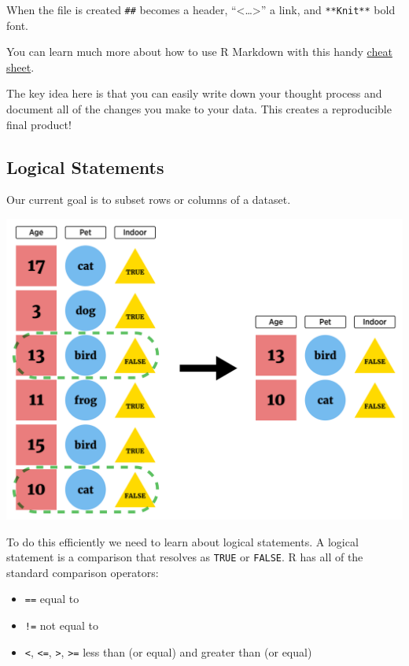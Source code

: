 \documentclass[
]{book}
\providecommand{\tightlist}{%
  \setlength{\itemsep}{0pt}\setlength{\parskip}{0pt}}
\theoremstyle{definition}
\theoremstyle{definition}
\theoremstyle{definition}
\theoremstyle{remark}
\begin{document}
When the file is created \texttt{\#\#} becomes a header, ``\textless{}\ldots{}\textgreater{}'' a link, and \texttt{**Knit**} bold font.

You can learn much more about how to use R Markdown with this handy \href{https://www.rstudio.com/wp-content/uploads/2015/03/rmarkdown-reference.pdf}{cheat sheet}.

The key idea here is that you can easily write down your thought process and document all of the changes you make to your data. This creates a reproducible final product!

\hypertarget{logical-statements-1}{%
\subsection{Logical Statements}\label{logical-statements-1}}

Our current goal is to subset rows or columns of a dataset.

\begin{center}\includegraphics[width=0.8\linewidth]{img/filterVisualF} \end{center}

To do this efficiently we need to learn about logical statements. A logical statement is a comparison that resolves as \texttt{TRUE} or \texttt{FALSE}. R has all of the standard comparison operators:

\begin{itemize}
\tightlist
\item
  \texttt{==} equal to
\item
  \texttt{!=} not equal to
\item
  \texttt{\textless{}}, \texttt{\textless{}=}, \texttt{\textgreater{}}, \texttt{\textgreater{}=} less than (or equal) and greater than (or equal)
\end{itemize}
\end{document}
